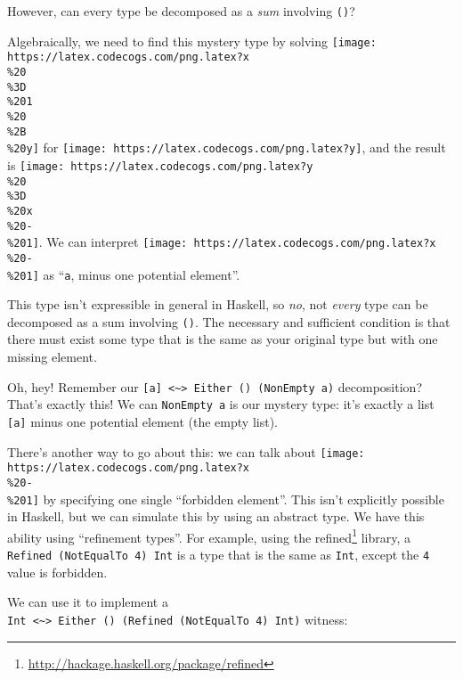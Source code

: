 \documentclass[]{article}
\renewcommand{\href}[2]{#2\footnote{\url{#1}}}
\begin{document}
However, can every type be decomposed as a \emph{sum} involving \texttt{()}?

Algebraically, we need to find this mystery type by solving
\texttt{[image: https://latex.codecogs.com/png.latex?x\\\%20\\\%3D\\\%201\\\%20\\\%2B\\\%20y]}
for \texttt{[image: https://latex.codecogs.com/png.latex?y]}, and the result is
\texttt{[image: https://latex.codecogs.com/png.latex?y\\\%20\\\%3D\\\%20x\\\%20-\\\%201]}.
We can interpret
\texttt{[image: https://latex.codecogs.com/png.latex?x\\\%20-\\\%201]} as
``\texttt{a}, minus one potential element''.

This type isn't expressible in general in Haskell, so \emph{no}, not
\emph{every} type can be decomposed as a sum involving \texttt{()}. The
necessary and sufficient condition is that there must exist some type that is
the same as your original type but with one missing element.

Oh, hey! Remember our
\texttt{{[}a{]}\ \textless{}\textasciitilde{}\textgreater{}\ Either\ ()\ (NonEmpty\ a)}
decomposition? That's exactly this! We can \texttt{NonEmpty\ a} is our mystery
type: it's exactly a list \texttt{{[}a{]}} minus one potential element (the
empty list).

There's another way to go about this: we can talk about
\texttt{[image: https://latex.codecogs.com/png.latex?x\\\%20-\\\%201]} by specifying
one single ``forbidden element''. This isn't explicitly possible in Haskell, but
we can simulate this by using an abstract type. We have this ability using
``refinement types''. For example, using the
\href{http://hackage.haskell.org/package/refined}{refined} library, a
\texttt{Refined\ (NotEqualTo\ 4)\ Int} is a type that is the same as
\texttt{Int}, except the \texttt{4} value is forbidden.

We can use it to implement a
\texttt{Int\ \textless{}\textasciitilde{}\textgreater{}\ Either\ ()\ (Refined\ (NotEqualTo\ 4)\ Int)}
witness:
\end{document}
